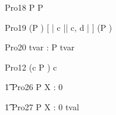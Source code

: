 \begin{circus}
    \circprocess Pro18 \circdef P \circendby {}  P \circendby {} \rcirctime  \\
\end{circus}
 
\begin{circus}
    \circprocess Pro19 \circdef (P \circendby {} \rcirctime ) [ | \lchanset c \rchanset || \lchanset c, d \rchanset | ] (P \circendby {} \rcirctime ) \\
\end{circus}



\begin{circus}
    \circprocess Pro20 \circdef \circvres tvar : \nat  \circspot P \circendby \lcirctime tvar \rcirctime \\
\end{circus}   


\begin{circus}
    \circprocess Pro12 \circdef (c \then P \circendby {} \rcirctime ) \circhide c \\
\end{circus} 
     
\begin{circus}
    \t1 Pro26 \circdef P \circendby \lcirctime X : 0  \rcirctime\\
\end{circus}        

\begin{circus}
    \t1 Pro27 \circdef P \circendby \lcirctime X : 0 \upto tval \rcirctime  \\
\end{circus} 
